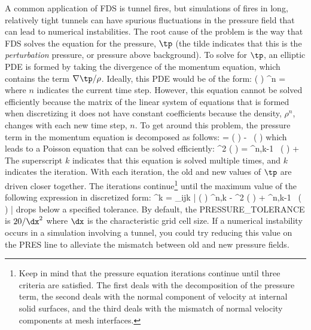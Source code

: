 \documentclass[11pt]{book}
\begin{document}
A common application of FDS is tunnel fires, but simulations of fires in long, relatively tight tunnels can have spurious fluctuations in the pressure field that can lead to numerical instabilities. The root cause of the problem is the way that FDS solves the equation for the pressure, $\tp$ (the tilde indicates that this is the {\em perturbation} pressure, or pressure above background). To solve for $\tp$, an elliptic PDE is formed by taking the divergence of the momentum equation, which contains the term $\nabla \tp / \rho$. Ideally, this PDE would be of the form:
\be
   \nabla \cdot \left(  \right) \nabla \tp^{n} = \; \cdots
\ee
where $n$ indicates the current time step. However, this equation cannot be solved efficiently because the matrix of the linear system of equations that is formed when discretizing it does not have constant coefficients because the density, $\rho^n$, changes with each new time step, $n$. To get around this problem, the pressure term in the momentum equation is decomposed as follows:
\be
    \nabla \tp = \nabla \left( \frac{\tp}{\rho}\right) - \tp \, \nabla \left( \right) \label{p_decomp}
\ee
which leads to a Poisson equation that can be solved efficiently:
\be
   \nabla^2 \left(  \right) = \nabla \cdot \tp^{n,k-1} \, \nabla \left( \right) + \; \cdots
\ee
The superscript $k$ indicates that this equation is solved multiple times, and $k$ indicates the iteration. With each iteration, the old and new values of $\tp$ are driven closer together. The iterations continue\footnote{Keep in mind that the pressure equation iterations continue until three criteria are satisfied. The first deals with the decomposition of the pressure term, the second deals with the normal component of velocity at internal solid surfaces, and the third deals with the mismatch of normal velocity components at mesh interfaces.} until the maximum value of the following expression in discretized form:
\be
  \epsilon^k = \max_{ijk} \left| \nabla \cdot \left(  \right) \nabla \tp^{n,k} - \nabla^2 \left(  \right) + \nabla \cdot \tp^{n,k-1} \, \nabla \left( \right) \right|
\ee
drops below a specified tolerance. By default, the {\ct PRESSURE\_TOLERANCE} is $20/\dx^2$ where $\dx$ is the characteristic grid cell size. If a numerical instability occurs in a simulation involving a tunnel, you could try reducing this value on the {\ct PRES} line to alleviate the mismatch between old and new pressure fields.
\end{document}
